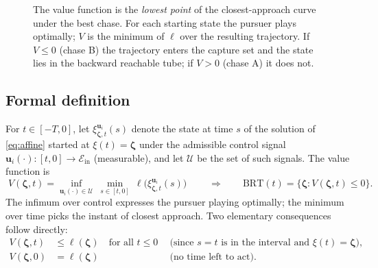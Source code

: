\documentclass[11pt]{article}
\newcommand{\Ein}{\mathcal{E}_{\mathrm{in}}}
\newcommand{\zbf}{\bm{\zeta}}
\newcommand{\ubf}{\bm{u}}
\begin{document}
\begin{figure}[h]
\centering
{}
\caption{The value function is the \emph{lowest point} of the closest-approach curve under the
best chase. For each starting state the pursuer plays optimally; $V$ is the minimum of
$\ell$ over the resulting trajectory. If $V\le0$ (chase B) the trajectory enters the capture set
and the state lies in the backward reachable tube; if $V>0$ (chase A) it does not.}
\label{fig:value}
\end{figure}

\subsection{Formal definition}

For $t\in[-T,0]$, let $\xi^{\ubf_i}_{\zbf,t}(s)$ denote the state at time $s$ of the solution of
\eqref{eq:affine} started at $\xi(t)=\zbf$ under the admissible control signal
$\ubf_i(\cdot):[t,0]\to\Ein$ (measurable), and let $\mathcal{U}$ be the set of such signals. The
value function is
\begin{equation}\label{eq:value}
\boxed{\;V(\zbf,t)=\inf_{\ubf_i(\cdot)\in\mathcal{U}}\ \min_{s\in[t,0]}\ \ell\big(\xi^{\ubf_i}_{\zbf,t}(s)\big)\;}
\qquad\Longrightarrow\qquad
\mathrm{BRT}(t)=\{\zbf:V(\zbf,t)\le0\}.
\end{equation}
The infimum over control expresses the pursuer playing optimally; the minimum over time picks the
instant of closest approach. Two elementary consequences follow directly:
\begin{align}
V(\zbf,t)&\le\ell(\zbf)\quad\text{for all }t\le0
&&\text{(since $s=t$ is in the interval and $\xi(t)=\zbf$),}\label{eq:tube}\\
V(\zbf,0)&=\ell(\zbf) &&\text{(no time left to act).}\label{eq:terminal}
\end{align}
\end{document}
